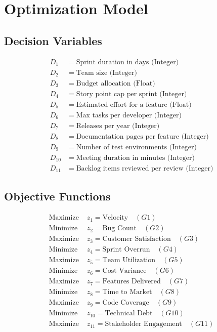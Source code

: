 \documentclass{article}
\begin{document}
\section*{Optimization Model}

\subsection*{Decision Variables}
\begin{align*}
D_1 &= \text{Sprint duration in days (}\mathrm{Integer}\text{)} \\
D_2 &= \text{Team size (}\mathrm{Integer}\text{)} \\
D_3 &= \text{Budget allocation (}\mathrm{Float}\text{)} \\
D_4 &= \text{Story point cap per sprint (}\mathrm{Integer}\text{)} \\
D_5 &= \text{Estimated effort for a feature (}\mathrm{Float}\text{)} \\
D_6 &= \text{Max tasks per developer (}\mathrm{Integer}\text{)} \\
D_7 &= \text{Releases per year (}\mathrm{Integer}\text{)} \\
D_8 &= \text{Documentation pages per feature (}\mathrm{Integer}\text{)} \\
D_9 &= \text{Number of test environments (}\mathrm{Integer}\text{)} \\
D_{10} &= \text{Meeting duration in minutes (}\mathrm{Integer}\text{)} \\
D_{11} &= \text{Backlog items reviewed per review (}\mathrm{Integer}\text{)}
\end{align*}

\subsection*{Objective Functions}
\begin{align}
\text{Maximize } & z_1 = \text{Velocity} \quad (G1) \\
\text{Minimize } & z_2 = \text{Bug Count} \quad (G2) \\
\text{Maximize } & z_3 = \text{Customer Satisfaction} \quad (G3) \\
\text{Minimize } & z_4 = \text{Sprint Overrun} \quad (G4) \\
\text{Maximize } & z_5 = \text{Team Utilization} \quad (G5) \\
\text{Minimize } & z_6 = \text{Cost Variance} \quad (G6) \\
\text{Maximize } & z_7 = \text{Features Delivered} \quad (G7) \\
\text{Minimize } & z_8 = \text{Time to Market} \quad (G8) \\
\text{Maximize } & z_9 = \text{Code Coverage} \quad (G9) \\
\text{Minimize } & z_{10} = \text{Technical Debt} \quad (G10) \\
\text{Maximize } & z_{11} = \text{Stakeholder Engagement} \quad (G11)
\end{align}
\end{document}
